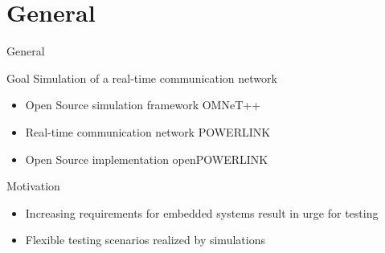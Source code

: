 \section{General}

\begin{frame}{General}
    
    \begin{block}{Goal}
        Simulation of a real-time communication network
        \begin{itemize}
            \item Open Source simulation framework OMNeT++
            \item Real-time communication network POWERLINK
            \item Open Source implementation openPOWERLINK
        \end{itemize}
    \end{block}
    
    \begin{block}{Motivation}
        \begin{itemize}
            \item Increasing requirements for embedded systems result in urge for testing
            \item Flexible testing scenarios realized by simulations
        \end{itemize}
    \end{block}
    
\end{frame}